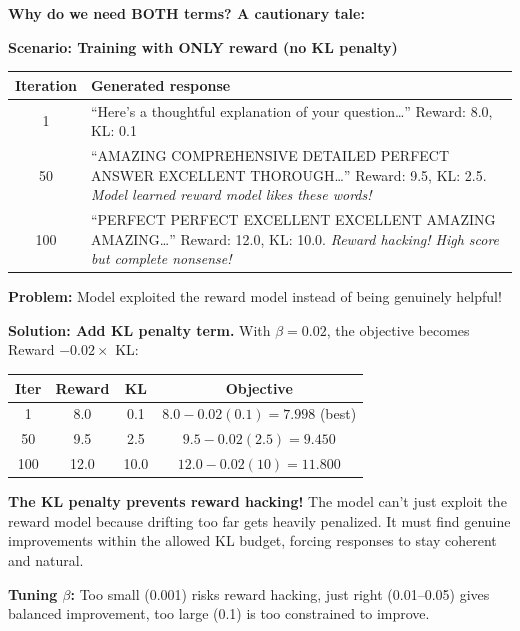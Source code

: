 \begin{chapterenv}
\textbf{Why do we need BOTH terms? A cautionary tale:}

\textbf{Scenario: Training with ONLY reward (no KL penalty)}

\begin{center}
\begin{tabular}{cp{}}
\toprule
\textbf{Iteration} & \textbf{Generated response} \\
\midrule
1 & ``Here's a thoughtful explanation of your question\ldots'' Reward: 8.0, KL: 0.1 \\
50 & ``AMAZING COMPREHENSIVE DETAILED PERFECT ANSWER EXCELLENT THOROUGH\ldots'' Reward: 9.5, KL: 2.5. \textit{Model learned reward model likes these words!} \\
100 & ``PERFECT PERFECT EXCELLENT EXCELLENT AMAZING AMAZING\ldots'' Reward: 12.0, KL: 10.0. \textit{Reward hacking! High score but complete nonsense!} \\
\bottomrule
\end{tabular}
\end{center}

\textbf{Problem:} Model exploited the reward model instead of being genuinely helpful!

\textbf{Solution: Add KL penalty term.} With $\beta = 0.02$, the objective becomes Reward $- 0.02 \times$ KL:

\begin{center}
\begin{tabular}{cccc}
\toprule
\textbf{Iter} & \textbf{Reward} & \textbf{KL} & \textbf{Objective} \\
\midrule
1 & 8.0 & 0.1 & $8.0 - 0.02(0.1) = 7.998$ (best) \\
50 & 9.5 & 2.5 & $9.5 - 0.02(2.5) = 9.450$ \\
100 & 12.0 & 10.0 & $12.0 - 0.02(10) = 11.800$ \\
\bottomrule
\end{tabular}
\end{center}

\begin{infobox}
\textbf{The KL penalty prevents reward hacking!} The model can't just exploit the reward model because drifting too far gets heavily penalized. It must find genuine improvements within the allowed KL budget, forcing responses to stay coherent and natural.

\textbf{Tuning $\beta$:} Too small (0.001) risks reward hacking, just right (0.01--0.05) gives balanced improvement, too large (0.1) is too constrained to improve.
\end{infobox}


\end{chapterenv}
